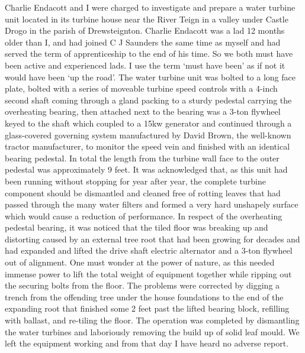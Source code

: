Charlie Endacott and I were charged to investigate and prepare a water turbine
unit located in its turbine house near the River Teign in a valley under Castle
Drogo in the parish of Drewsteignton. Charlie Endacott was a lad 12 months
older than I, and had joined C J Saunders the same time as myself and had
served the term of apprenticeship to the end of his time. So we both must have
been active and experienced lads. I use the term `must have been' as if not it
would have been `up the road'. The water turbine unit was bolted to a long face
plate, bolted with a series of moveable turbine speed controls with a 4-inch
second shaft coming through a gland packing to a sturdy pedestal carrying the
overheating bearing, then attached next to the bearing was a 3-ton flywheel
keyed to the shaft which coupled to a 15kw generator and continued through a
glass-covered governing system manufactured by David Brown, the well-known
tractor manufacturer, to monitor the speed vein and finished with an identical
bearing pedestal. In total the length from the turbine wall face to the outer
pedestal was approximately 9 feet. It was acknowledged that, as this unit had
been running without stopping for year after year, the complete turbine
component should be dismantled and cleaned free of rotting leaves that had
passed through the many water filters and formed a very hard unshapely surface
which would cause a reduction of performance. In respect of the overheating
pedestal bearing, it was noticed that the tiled floor was breaking up and
distorting caused by an external tree root that had been growing for decades
and had expanded and lifted the drive shaft electric alternator and a 3-ton
flywheel out of alignment. One must wonder at the power of nature, as this
needed immense power to lift the total weight of equipment together while
ripping out the securing bolts from the floor. The problems were corrected by
digging a trench from the offending tree under the house foundations to the end
of the expanding root that finished some 2 feet past the lifted bearing block,
refilling with ballast, and re-tiling the floor. The operation was completed by
dismantling the water turbines and laboriously removing the build up of solid
leaf mould. We left the equipment working and from that day I have heard no
adverse report.

